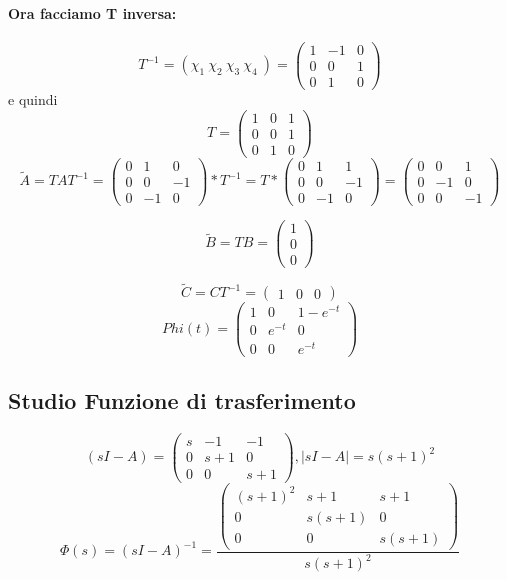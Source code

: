 \documentclass{article}
\begin{document}
\paragraph{Ora facciamo T inversa:} \[ T^{-1} = (\chi_1\ \chi_2\ \chi_3\ \chi_4\ ) = \left(\begin{matrix}1 & -1 & 0\\0 & 0 & 1\\0 & 1 & 0\end{matrix}\right) \]
e quindi \[T = \left(\begin{matrix}1 & 0 & 1\\0 & 0 & 1\\0 & 1 & 0\end{matrix}\right)\]
\[ \widetilde{A} = TAT^{-1} = \left(\begin{matrix}0 & 1 & 0\\0 & 0 & -1\\0 & -1 & 0\end{matrix}\right) * T^{-1} = T*\left(\begin{matrix}0 & 1 & 1\\0 & 0 & -1\\0 & -1 & 0\end{matrix}\right) =\left(\begin{matrix}0 & 0 & 1\\0 & -1 & 0\\0 & 0 & -1\end{matrix}\right) \]

\[ \widetilde{B} = T B = \left(\begin{matrix}1\\0\\0\end{matrix}\right) \]

\[ \widetilde{C} = C T^{-1} = \left(\begin{matrix}1 & 0 & 0\end{matrix}\right) \]
\[Phi(t) = \left(\begin{matrix}1 & 0 & 1 - e^{- t}\\0 & e^{- t} & 0\\0 & 0 & e^{- t}\end{matrix}\right) \]

\subsection{Studio Funzione di trasferimento}

\[ (sI-A) = \left(\begin{matrix}s & -1 & -1\\0 & s + 1 & 0\\0 & 0 & s + 1\end{matrix}\right), |sI-A| = s \left(s + 1\right)^{2} \]
\[ \Phi(s) = (sI-A)^{-1} = \frac{\left(\begin{matrix}\left(s + 1\right)^{2} & s + 1 & s + 1\\0 & s \left(s + 1\right) & 0\\0 & 0 & s \left(s + 1\right)\end{matrix}\right)}{s \left(s + 1\right)^{2}} \]
\end{document}

